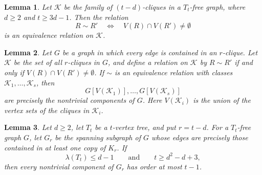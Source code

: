 \documentclass[10pt,a4paper]{amsart}
\newtheorem{lemma}{Lemma}
\newcommand{\cl}{\mathcal K}
\begin{document}
\begin{lemma}\label{large-transitivity}
Let \(\cl\) be the family of \((t-d)\)-cliques in a \(T_t\)-free graph, where \(d\ge2\) and \(t\ge3d-1\). Then the relation
\[
R\sim R'
\quad\Longleftrightarrow\quad
V(R)\cap V(R')\ne\emptyset
\]
is an equivalence relation on \(\cl\).
\end{lemma}

\begin{lemma}\label{pg}
Let \(G\) be a graph in which every edge is contained in an \(r\)-clique. Let \(\cl\) be the set of all \(r\)-cliques in \(G\), and define a relation on \(\cl\) by \(R\sim R'\) if and only if \(V(R)\cap V(R')\ne\emptyset\). If \(\sim\) is an equivalence relation with classes \(\cl_1,\ldots,\cl_s\), then
\[
G[V(\cl_1)],\ldots,G[V(\cl_s)]
\]
are precisely the nontrivial components of \(G\). Here \(V(\cl_i)\) is the union of the vertex sets of the cliques in \(\cl_i\).
\end{lemma}

\begin{lemma}\label{component-bound}
Let $d\ge2$, let $T_t$ be a $t$-vertex tree, and put $r=t-d$. For a $T_t$-free graph $G$, let $G_r$ be the spanning subgraph of $G$ whose edges are precisely those contained in at least one copy of $K_r$. If
\[
\lambda(T_t)\le d-1
\qquad\text{and}\qquad
 t\ge d^2-d+3,
\]
then every nontrivial component of $G_r$ has order at most $t-1$.
\end{lemma}
\end{document}
